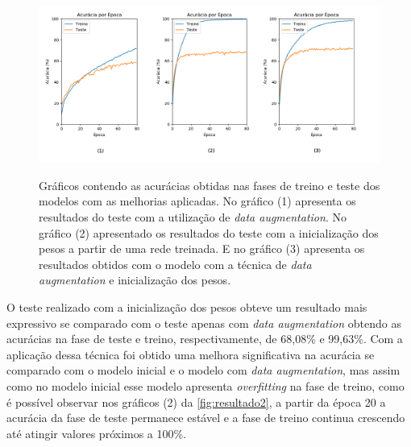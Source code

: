 \begin{figure}[H]
  \centering
  \caption{Gráficos contendo as acurácias obtidas nas fases de treino e teste dos modelos com as melhorias aplicadas. No gráfico (1) apresenta os resultados do teste com a utilização de \textit{data augmentation}. No gráfico (2) apresentado os resultados do teste com a inicialização dos pesos a partir de uma rede treinada. E no gráfico (3) apresenta os resultados obtidos com o modelo com a técnica de \textit{data augmentation} e inicialização dos pesos.}
  \includegraphics[width=500pt]{dados/figuras/resultado2}
  \label{fig:resultado2}
\end{figure}

\par O teste realizado com a inicialização dos pesos obteve um resultado mais expressivo se comparado com o teste apenas com \textit{data augmentation} obtendo as acurácias na fase de teste e treino, respectivamente, de 68,08\% e 99,63\%. Com a aplicação dessa técnica foi obtido uma melhora significativa na acurácia se comparado com o modelo inicial e o modelo com \textit{data augmentation}, mas assim como no modelo inicial esse modelo apresenta \textit{overfitting} na fase de treino, como é possível observar nos gráficos (2) da \autoref{fig:resultado2}, a partir da época 20 a acurácia da fase de teste permanece estável e a fase de treino continua crescendo até atingir valores próximos a 100\%.

